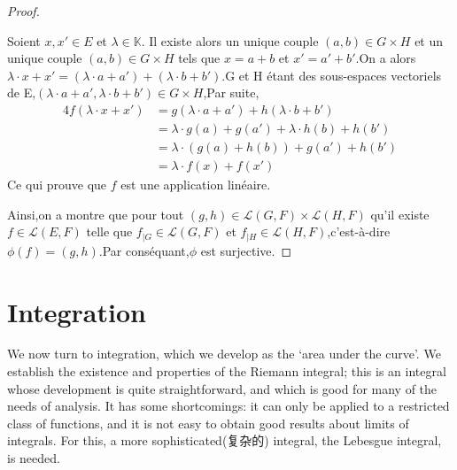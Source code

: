 \documentclass[12pt]{book}
\theoremstyle{definition}\newtheorem{dfn}{Définition}[chapter]
\theoremstyle{plain}\newtheorem{thm}{Théorème}[chapter]
\theoremstyle{plain}\newtheorem{prp}{Proposition}[chapter]
\theoremstyle{plain}\newtheorem{lem}{\bf Lemme}[chapter]
\theoremstyle{plain}\newtheorem{axm}{\bf Axiome}[chapter]
\theoremstyle{plain}\newtheorem{lmm}{\bf Lemme}[chapter]
\theoremstyle{plain}\newtheorem{cor}{\bf Corollaire}[chapter]
\theoremstyle{remark}\newtheorem{rem}{Remarque}[chapter]
\begin{document}
\begin{proof}
\begin{itemize}
\begin{itemize}
 Soient $x,x'\in E$ et $\lambda \in \mathbb{K}$.
 Il existe alors un unique couple $(a,b)\in G\times H$ et un unique couple $(a,b)\in G\times H$ tels que $x=a+b$ et $x'=a'+b'$.On a alors $\lambda \cdot x+x'=(\lambda\cdot a+a')+(\lambda\cdot b+b')$.G et H étant des sous-espaces vectoriels de E,$ (\lambda\cdot a+a',\lambda\cdot b+b')\in G\times H$,Par suite,
 \begin{alignat*}{4}
 f(\lambda\cdot x+x')&=g(\lambda\cdot a+a')+h(\lambda\cdot b+b')\\
 &=\lambda \cdot g(a)+g(a')+\lambda\cdot h(b)+h(b')\\
 &=\lambda\cdot(g(a)+h(b))+g(a')+h(b')\\
 &=\lambda\cdot f(x)+f(x')
 \end{alignat*}
 Ce qui prouve que $f$ est une application linéaire.
\end{itemize}
\end{itemize}
Ainsi,on a montre que pour tout $(g,h)\in \mathcal{L}(G,F)\times \mathcal{L}(H,F)$ qu'il existe $f\in \mathcal{L}(E,F)$ telle que
$f_{|G}\in\mathcal{L}(G,F)$
et $f_{|H}\in\mathcal{L}(H,F)$,c'est-à-dire $\phi(f)=(g,h)$.Par conséquant,$\phi$ est surjective.

\end{proof}
\chapter{Integration}
We now turn to integration, which we develop as the ‘area under the curve’. We establish the existence and properties of the Riemann integral; this is an integral whose development is quite straightforward, and which is good for many of the needs of analysis. It has some shortcomings: it can only be applied to a restricted class of functions, and it is not easy to obtain good results about limits of integrals. For this, a more sophisticated(复杂的) integral, the Lebesgue integral, is needed.
\end{document}
